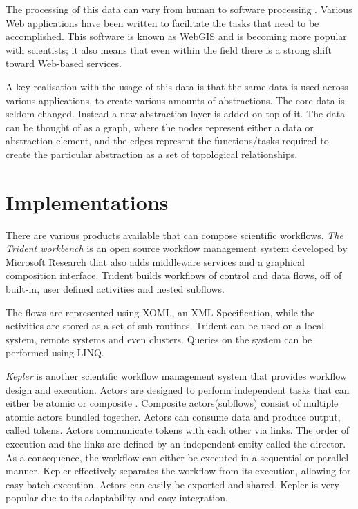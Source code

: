 The processing of this data can vary from human to software processing
\cite{DiMartino:2007:TAG:1341012.1341081}.  Various Web applications have been
written to facilitate the tasks that need to be accomplished.  This software is
known as WebGIS and is becoming more popular with scientists; it also means
that even within the field there is a strong shift toward Web-based services.

A key realisation with the usage of this data is that the same data is used
across various applications, to create various amounts of
abstractions\cite{ElAdnani:2001:MLF:512161.512177}.  The core data is seldom
changed. Instead a new abstraction layer is added on top of it. The data can be
thought of as a graph, where the nodes represent either a data or abstraction
element, and the edges represent the functions/tasks required to create the
particular abstraction as a set of topological relationships. 

\section{Implementations}
There are various products available that can compose scientific workflows.
\emph{The Trident workbench} \cite{Simmhan:2009:BTS:1673063.1673121} is an open
source workflow management system developed by Microsoft Research that also
adds middleware services and a graphical composition interface. Trident builds
workflows of control and data flows, off of built-in, user defined activities
and nested subflows.

The flows are represented using XOML, an XML Specification, while the
activities are stored as a set of sub-routines\cite{Simmhan2011790}. Trident
can be used on a local system, remote systems and even clusters.  Queries on
the system can be performed using LINQ.


\emph{Kepler} is another scientific workflow management system that
provides workflow design and execution.  Actors are designed to perform
independent tasks that can either be atomic or  composite
\cite{Wang:2009:KHG:1645164.1645176}.  Composite actors(subflows) consist of
multiple   atomic actors bundled together. Actors can consume data and produce
output, called tokens. Actors communicate tokens with each other via links. The
order of execution and the links are defined by an independent entity called
the director. As a consequence, the workflow can either be executed in a
sequential or parallel manner. Kepler effectively separates the workflow from
its execution, allowing for easy batch execution. Actors can easily be exported
and shared.  Kepler is very popular due to its adaptability and easy
integration.


